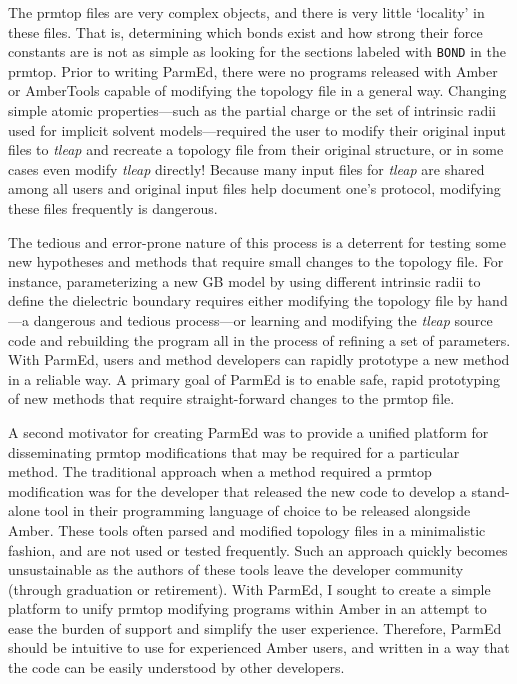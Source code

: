 The prmtop files are very complex objects, and there is very little `locality' in
these files. That is, determining which bonds exist and how strong their force
constants are is not as simple as looking for the sections labeled with
{\tt BOND} in the prmtop. Prior to writing ParmEd, there were no programs
released with Amber or AmberTools capable of modifying the topology file in a
general way. Changing simple atomic properties---such as the partial charge or
the set of intrinsic radii used for implicit solvent models---required the user
to modify their original input files to \emph{tleap} and recreate a topology
file from their original structure, or in some cases even modify \emph{tleap}
directly! Because many input files for \emph{tleap} are shared among all users
and original input files help document one's protocol, modifying these files
frequently is dangerous.

The tedious and error-prone nature of this process is a deterrent for testing
some new hypotheses and methods that require small changes to the topology file.
For instance, parameterizing a new GB model by using different intrinsic radii
to define the dielectric boundary requires either modifying the topology file by
hand---a dangerous and tedious process---or learning and modifying the
\emph{tleap} source code and rebuilding the program all in the process of
refining a set of parameters. With ParmEd, users and method developers can
rapidly prototype a new method in a reliable way. A primary goal of ParmEd is to
enable safe, rapid prototyping of new methods that require straight-forward
changes to the prmtop file.

A second motivator for creating ParmEd was to provide a unified platform for
disseminating prmtop modifications that may be required for a particular method.
The traditional approach when a method required a prmtop modification was for
the developer that released the new code to develop a stand-alone tool in their
programming language of choice to be released alongside Amber. These tools often
parsed and modified topology files in a minimalistic fashion, and are not used
or tested frequently. Such an approach quickly becomes unsustainable as the
authors of these tools leave the developer community (\eg through graduation or
retirement). With ParmEd, I sought to create a simple platform to unify prmtop
modifying programs within Amber in an attempt to ease the burden of support and
simplify the user experience. Therefore, ParmEd should be intuitive to use for
experienced Amber users, and written in a way that the code can be easily
understood by other developers.

